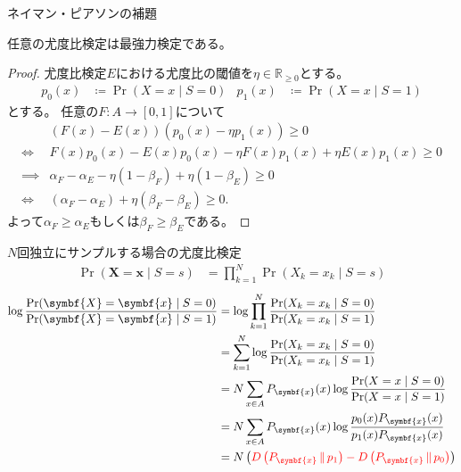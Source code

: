 \documentclass[lualatex,handout]{beamer}
\newcommand{\mycolor}[2]{%
  \begingroup
  \colorlet{currentcolor}{.}%
  \color{#1}#2%
  \color{currentcolor}%
  \endgroup
}
\newcommand{\emm}[1]{\mycolor{red}{#1}}
\newcommand\KL[2]{D\left(#1\,\|\,#2\right)}
\theoremstyle{definition}
\begin{document}
\begin{frame}{ネイマン・ピアソンの補題}
\small
\begin{lemma}[ネイマン・ピアソンの補題]
任意の尤度比検定は最強力検定である。
\end{lemma}
\begin{proof}
尤度比検定$E$における尤度比の閾値を$\eta\in\mathbb{R}_{\ge 0}$とする。
\begin{align*}
p_0(x) &\coloneq \Pr(X = x\mid S = 0)&
p_1(x) &\coloneq \Pr(X = x\mid S = 1)
\end{align*}
とする。
任意の$F\colon A\to[0,1]$について
\begin{align*}
&(F(x) - E(x)) (p_0(x) - \eta p_1(x))\ge 0\\
\iff&F(x)p_0(x) - E(x)p_0(x) - \eta F(x) p_1(x) + \eta E(x) p_1(x)\ge 0\\
\implies&\alpha_F - \alpha_E - \eta (1-\beta_F)  + \eta (1-\beta_E)\ge 0\\
\iff&(\alpha_F - \alpha_E) + \eta(\beta_F-\beta_E)\ge 0.
\end{align*}
よって$\alpha_F\ge\alpha_E$もしくは$\beta_F\ge\beta_E$である。
\end{proof}
\end{frame}

\begin{frame}{$N$回独立にサンプルする場合の尤度比検定}
\begin{align*}
\Pr(\symbf{X}=\symbf{x}\mid S = s) &= \prod_{k=1}^N \Pr(X_k=x_k\mid S = s)
\end{align*}
\begin{align*}
\log \frac{\Pr(\symbf{X}=\symbf{x}\mid S = 0)}{\Pr(\symbf{X}=\symbf{x}\mid S = 1)}
&=
\log \prod_{k=1}^N \frac{\Pr(X_k=x_k\mid S = 0)}{\Pr(X_k=x_k\mid S = 1)}\\
&=
\sum_{k=1}^N \log \frac{\Pr(X_k=x_k\mid S = 0)}{\Pr(X_k=x_k\mid S = 1)}\\
&=
N\sum_{x\in A} P_{\symbf{x}}(x) \log \frac{\Pr(X=x\mid S = 0)}{\Pr(X=x\mid S = 1)}\\
&=
N\sum_{x\in A} P_{\symbf{x}}(x) \log \frac{p_0(x)P_{\symbf{x}}(x)}{p_1(x)P_{\symbf{x}}(x)}\\
&=
N\left(\emm{\KL{P_{\symbf{x}}}{p_1} - \KL{P_{\symbf{x}}}{p_0}}\right)
\end{align*}
\end{frame}
\end{document}
